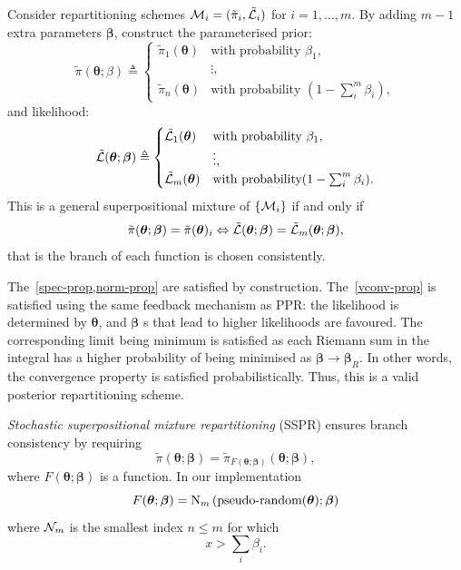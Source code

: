\documentclass[usenatbib]{mnras}
\begin{document}
Consider repartitioning schemes
${\cal M}_{i} = (\tilde{\pi}_{i}, \tilde{\cal L}_{i})$ for
$i=1, \ldots, m$. By adding \(m-1\) extra parameters $\bm{\beta}$,
construct the parameterised prior:
\begin{equation*}
  \tilde{\pi}(\bm{\theta}; \beta)  \triangleq \begin{cases}
	\tilde{\pi}_{1}(\bm{\theta}) & \text{with probability } \beta_{1},\\
	& \vdots,\\
	\tilde{\pi}_{n}(\bm{\theta}) & \text{with probability } (1- \sum_{i}^{m}\beta_{i}),
	\end{cases}
\end{equation*}
and likelihood:
\begin{equation*}
  \tilde{\cal L}(\bm{\theta}; \bm{\beta})  \triangleq
  \begin{cases}
	\tilde{\cal L}_{1}(\bm{\theta}) &  \text{with probability } \beta_{1},\\
		    &\vdots,\\
	\tilde{\cal L}_{m}(\bm{\theta}) & \text{with probability} (1- \sum_{i}^{m}\beta_{i}).
\end{cases}
\end{equation*}
This is a general superpositional mixture of $\{{\cal M}_{i}\}$ if and only if
\begin{equation}
  \label{eq:sspr}
  \tilde{\pi}(\bm{\theta}; \bm{\beta}) = \tilde{\pi}(\bm{\theta})_{i} \Leftrightarrow \tilde{\cal L}(\bm{\theta}; \bm{\beta}) = \tilde{\cal L}_{m}(\bm{\theta}; \bm{\beta}), 
\end{equation}
that is the branch of each function is chosen consistently.

The~\cref{spec-prop,norm-prop} are satisfied by
construction. The~\cref{vconv-prop} is satisfied using the same
feedback mechanism as PPR: the likelihood is determined by
\(\bm{\theta}\), and \(\bm{\beta}\) s that lead to higher likelihoods are
favoured. The corresponding limit being minimum is satisfied as
each Riemann sum in the integral has a higher probability of being
minimised as \(\bm{\beta}\rightarrow\bm{\beta}_{R}\). In other words, the
convergence property is satisfied probabilistically. Thus, this is
a valid posterior repartitioning scheme.

\emph{Stochastic superpositional mixture repartitioning}
(SSPR) ensures branch consistency by requiring
\begin{equation*}
\tilde{\pi}(\bm{\theta}; \bm{\beta}) = \tilde{\pi}_{F(\bm{\theta};
  \bm{\beta})}(\bm{\theta};\bm{\beta}),
\end{equation*}
where $F(\bm{\theta}; \bm{\beta})$ is a function. In our implementation
\begin{equation*}
  F(\bm{\theta};\bm{\beta})= \text{{\cal N}}_{m}\left(\text{pseudo-random}(\bm{\theta}); \bm{\beta}\right)
\end{equation*}
where \({\cal N}_{m}\) is the smallest index \(n \leq m\) for
which \[x > \sum_{i}\beta_{i}.\]
\end{document}
